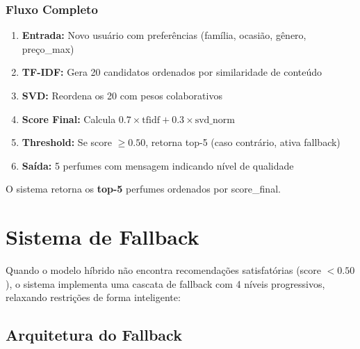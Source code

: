 \documentclass[12pt,a4paper]{article}
\begin{document}
\subsubsection{Fluxo Completo}

\begin{enumerate}
    \item \textbf{Entrada:} Novo usuário com preferências (família, ocasião, gênero, preço\_max)
    
    \item \textbf{TF-IDF:} Gera 20 candidatos ordenados por similaridade de conteúdo
    
    \item \textbf{SVD:} Reordena os 20 com pesos colaborativos
    
    \item \textbf{Score Final:} Calcula $0.7 \times \text{tfidf} + 0.3 \times \text{svd\_norm}$
    
    \item \textbf{Threshold:} Se score $\geq 0.50$, retorna top-5 (caso contrário, ativa fallback)
    
    \item \textbf{Saída:} 5 perfumes com mensagem indicando nível de qualidade
\end{enumerate}

O sistema retorna os \textbf{top-5} perfumes ordenados por score\_final.

\section{Sistema de Fallback}

Quando o modelo híbrido não encontra recomendações satisfatórias (score $< 0.50$), o sistema implementa uma cascata de fallback com 4 níveis progressivos, relaxando restrições de forma inteligente:

\subsection{Arquitetura do Fallback}
\end{document}
